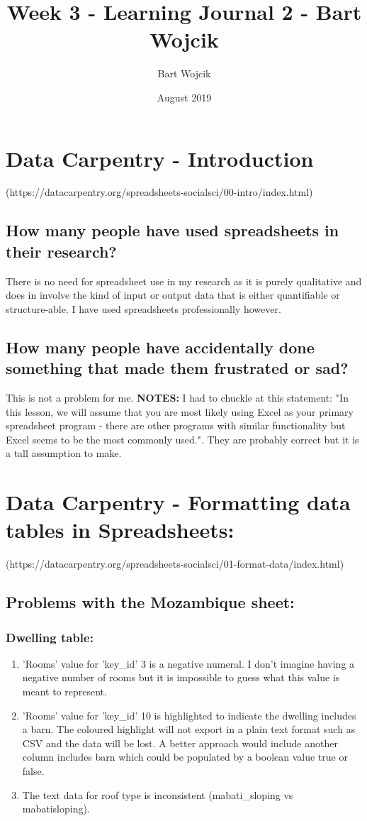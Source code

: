 \documentclass{article}
\title{Week 3 - Learning Journal 2 - Bart Wojcik}
\author{Bart Wojcik}
\date{August 2019}
\begin{document}
\maketitle

\section{Data Carpentry - Introduction}
(https://datacarpentry.org/spreadsheets-socialsci/00-intro/index.html)
\subsection{How many people have used spreadsheets in their research?}
There is no need for spreadsheet use in my research as it is purely qualitative and does in involve the kind of input or output data that is either quantifiable or structure-able. I have used spreadsheets professionally however.
\subsection{How many people have accidentally done something that made them frustrated or sad?}
This is not a problem for me.\newline
\newline
\textbf{NOTES:} I had to chuckle at this statement: "In this lesson, we will assume that you are most likely using Excel as your primary spreadsheet program - there are other programs with similar functionality but Excel seems to be the most commonly used.". They are probably correct but it is a tall assumption to make.

\section{Data Carpentry - Formatting data tables in Spreadsheets:}
(https://datacarpentry.org/spreadsheets-socialsci/01-format-data/index.html)

\subsection{Problems with the Mozambique sheet:}
\subsubsection{Dwelling table:}
\begin{enumerate}
    \item 'Rooms' value for 'key\_id' 3 is a negative numeral. I don't imagine having a negative number of rooms but it is impossible to guess what this value is meant to represent.
    \item 'Rooms' value for 'key\_id' 10 is highlighted to indicate the dwelling includes a barn. The coloured highlight will not export in a plain text format such as CSV and the data will be lost. A better approach would include another column includes barn which could be populated by a boolean value true or false.
    \item The text data for roof type is inconsistent (mabati\_sloping vs mabatisloping).
\end{enumerate}
\end{document}
